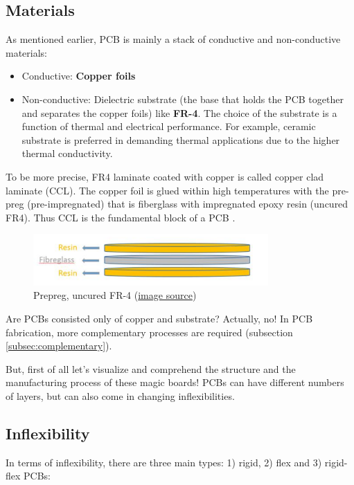 \documentclass[final]{cubedoc}
\begin{document}
	\subsection{Materials}
	
	As mentioned earlier, PCB is mainly a stack of conductive and non-conductive materials:
	
	\begin{itemize}
		\item Conductive: \textbf{Copper foils}
		\item Non-conductive: Dielectric substrate (the base that holds the PCB together and separates the copper foils) like \textbf{FR-4}. The choice of the substrate is a function of thermal and electrical performance. For example, ceramic substrate is preferred in demanding thermal applications due to the higher thermal conductivity.
	\end{itemize}
	
	To be more precise, FR4 laminate coated with copper is called copper clad laminate (CCL). The copper foil is glued within high temperatures with the pre-preg (pre-impregnated) that is fiberglass with impregnated epoxy resin (uncured FR4). Thus CCL is the fundamental block of a PCB \cite{pcbway:ccl}.
	
	\begin{figure}[h]
		\centering
		\includegraphics[width=0.8\textwidth,height=0.8\textheight,keepaspectratio]{assets/fiberglass_resin.png}
		\caption{Prepreg, uncured FR-4 \small({\href{https://web.archive.org/web/20200814080226/https://www.pcbway.com/blog/PCB_Basic_Information/Copper_Clad_Laminate.html}{image source}})}
	\end{figure}
	
	Are PCBs consisted only of copper and substrate? Actually, no! In PCB fabrication, more complementary processes are required (subsection \ref{subsec:complementary}).
	
	But, first of all let’s visualize and comprehend the structure and the manufacturing process of these magic boards! PCBs can have different numbers of layers, but can also come in changing inflexibilities. 
	
	\subsection{Inflexibility}
	In terms of inflexibility, there are three main types: 1) rigid, 2) flex and 3) rigid-flex PCBs:
	
\end{document}
